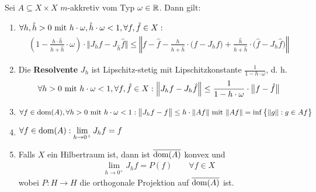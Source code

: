 \begin{theorem}\label{Theorem1.2.9}
Sei $A\subseteq X\times X$ $m$-akkretiv vom Typ $\omega\in\R$. Dann gilt:
\begin{enumerate}[label=(\alph*)]
\item $\begin{aligned}
\forall h,\hat{h}>0\mit h\cdot\omega,\hat{h}\cdot\omega<1,\forall f,\hat{f}\in X:\end{aligned}$
\begin{align*}
\left(1-\frac{h\cdot\hat{h}}{h+\hat{h}}\cdot\omega\right)\cdot\Big\Vert J_h f-J_{\hat{h}}\hat{f}\Big\Vert
\leq
\left\Vert f-\hat{f}-\frac{h}{h+\hat{h}}\cdot\big(f-J_h f\big)+\frac{\hat{h}}{h+\hat{h}}\cdot\big(\hat{f}-J_h \hat{f}\big)\right\Vert
\end{align*}
\item Die \textbf{Resolvente} $J_h$ ist Lipschitz-stetig mit Lipschitzkonstante $\frac{1}{1-h\cdot\omega}$, d. h.
\begin{align*}
\forall h>0\mit h\cdot \omega<1,\forall f,\hat{f}\in X:
\Big\Vert J_h f- J_h\hat{f}\Big\Vert
\leq
\frac{1}{1-h\cdot\omega}\cdot\big\Vert f-\hat{f}\big\Vert
\end{align*}
\item $\begin{aligned}
\forall f\in\dom(A),\forall h>0\mit h\cdot\omega<1:
\big\Vert J_h f-f\big\Vert
\leq
h\cdot\Vert A f\Vert\mit\Vert A f\Vert=\inf\big\lbrace\Vert g\Vert:g\in A f\big\rbrace
\end{aligned}$
\item $\begin{aligned}
\forall f\in\dom(A):\lim\limits_{h\to0^+} J_h f=f
\end{aligned}$
\item Falls $X$ ein Hilbertraum ist, dann ist $\overline{\dom(A)}$ konvex und
\begin{align*}
\lim\limits_{h\to0^+} J_h f=P(f)\qquad\forall f\in X
\end{align*}
wobei $P:H\to H$ die orthogonale Projektion auf $\overline{\dom(A)}$ ist.
\end{enumerate}
\end{theorem}

